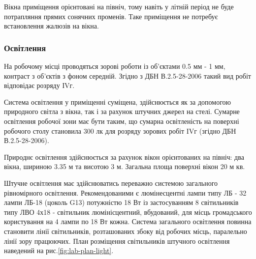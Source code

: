     Вікна приміщення орієнтовані на північ, тому навіть у літній період не буде потрапляння прямих сонячних променів. Таке приміщення не потребує встановлення жалюзів на вікна.

    \subsubsection{Освітлення}

    На робочому місці проводяться зорові роботи із об'єктами 0.5 мм - 1 мм, контраст з об'єктів з фоном середній. Згідно з ДБН В.2.5-28-2006\cite{lab-dbn28} такий вид робіт відповідає розряду ІVг.

    Система освітлення у приміщенні суміщена, здійснюється як за допомогою природного світла з вікна, так і за рахунок штучних джерел на стелі. Сумарне освітлення робочої зони має бути таким, що сумарна освітленість на поверхні робочого столу становила 300 лк для розряду зорових робіт IVг (згідно ДБН В.2.5-28-2006\cite{lab-dbn28}).

    Природнє освітлення здійснюється за рахунок вікон орієнтованих на північ: два вікна, шириною 3.35 м та висотою 3 м. Загальна площа поверхні вікон 20 м кв.

    Штучне освітлення має здійснюватись переважно системою загального рівномірного освітлення. Рекомендованими є люмінесцентні лампи типу ЛБ - 32 лампи ЛБ-18 (цоколь G13) потужністю 18 Вт із застосуванням 8 світильників типу ЛВО 4х18 - світильник люмінісцентний, вбудований, для місць громадського користування на 4 лампи по 18 Вт кожна.
    Система загального освітлення повинна становити лінії світильників, розташованих збоку від робочих місць, паралельно лінії зору працюючих. План розміщення світильників штучного освітлення наведений на рис.\ref{fig:lab-plan-light}.

